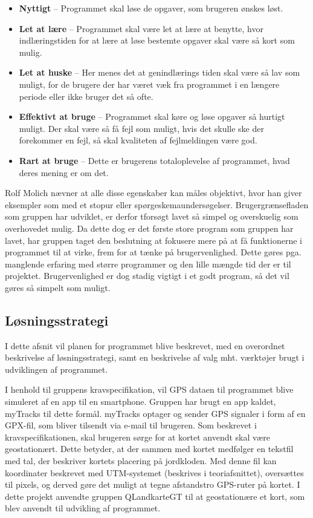 \begin{itemize}
	\item \textbf{Nyttigt} – Programmet skal løse de opgaver, som brugeren ønskes løst. 
	\item \textbf{Let at lære} – Programmet skal være let at lære at benytte, hvor indlæringstiden for at lære at løse bestemte opgaver skal være så kort som mulig.
	\item \textbf{Let at huske} – Her menes det at genindlærings tiden skal være så lav som muligt, for de brugere der har været væk fra programmet i en længere periode eller ikke bruger det så ofte. 
	\item \textbf{Effektivt at bruge} – Programmet skal køre og løse opgaver så hurtigt muligt. Der skal være så få fejl som muligt, hvis det skulle ske der forekommer en fejl, så skal kvaliteten af fejlmeldingen være god.
	\item \textbf{Rart at bruge} – Dette er brugerens totaloplevelse af programmet, hvad deres mening er om det.
\end{itemize}

Rolf Molich nævner at alle disse egenskaber kan måles objektivt, hvor han giver eksempler som med et stopur eller spørgeskemaundersøgelser. Brugergrænsefladen som gruppen har udviklet, er derfor tforsøgt lavet så simpel og overskuelig som overhovedet mulig. Da dette dog er det første store program som gruppen har lavet, har gruppen taget den beslutning at fokusere mere på at få funktionerne i programmet til at virke, frem for at tænke på brugervenlighed.  Dette gøres pga. manglende erfaring med større programmer og den lille mængde tid der er til projektet. Brugervenlighed er dog stadig vigtigt i et godt program, så det vil gøres så simpelt som muligt. 

\subsection{Løsningsstrategi}
I dette afsnit vil planen for programmet blive beskrevet, med en overordnet beskrivelse af løsningsstrategi, samt en beskrivelse af valg mht. værktøjer brugt i udviklingen af programmet.

I henhold til gruppens kravspecifikation, vil GPS dataen til programmet blive simuleret af en app til en smartphone. Gruppen har brugt en app kaldet, myTracks til dette formål. myTracks optager og sender GPS signaler i form af en GPX-fil, som bliver tilsendt via e-mail til brugeren.
Som beskrevet i kravspecifikationen, skal brugeren sørge for at kortet anvendt skal være geostationært. Dette betyder, at der sammen med kortet medfølger en tekstfil med tal, der beskriver kortets placering på jordkloden. Med denne fil kan koordinater beskrevet med UTM-systemet (beskrives i teoriafsnittet), oversættes til pixels, og derved gøre det muligt at tegne afstandstro GPS-ruter på kortet. I dette projekt anvendte gruppen QLandkarteGT til at geostationære et kort, som blev anvendt til udvikling af programmet.

